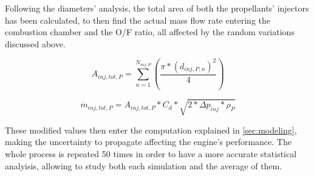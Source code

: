 Following the diameters' analysis, the total area of both the propellants' injectors has been calculated, to then find the actual mass flow rate entering the combustion chamber and the O/F ratio, all affected by the random variations discussed above. 


\begin{equation}
	A_{inj,tot,P} = \sum_{n=1}^{N_{inj,P}} \left(\frac{\pi*(d_{inj,P,n})^2}{4} \right)
    \label{eq:totalarea}
\end{equation}

\begin{equation}
    \dot m_{inj,tot,P} = A_{inj,tot,P} * C_d*\sqrt{2*\Delta p_{inj}*\rho_P}
    \label{eq:totalarea}
\end{equation}

These modified values then enter the computation explained in \autoref{sec:modeling}, making the uncertainty to propagate affecting the engine's performance. The whole process is repeated 50 times in order to have a more accurate statistical analyisis, allowing to study both each simulation and the average of them.









